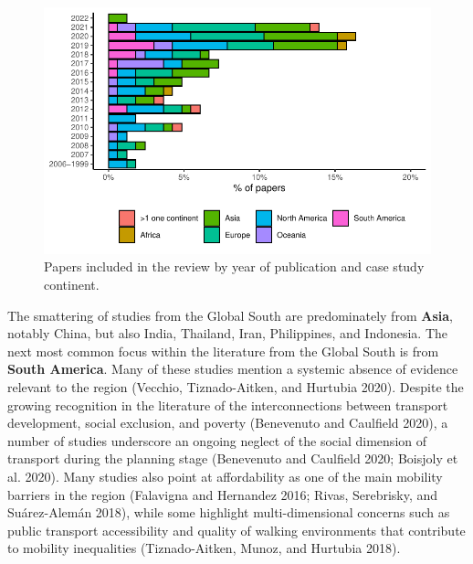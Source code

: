 \documentclass[12pt, oneside]{report}
\begin{document}
\begin{figure}

{\centering \includegraphics{just-transportation_files/figure-pdf/fig-fig3-1.pdf}

}

\caption{\label{fig-fig3}Papers included in the review by year of
publication and case study continent.}

\end{figure}

The smattering of studies from the Global South are predominately from
\textbf{Asia}, notably China, but also India, Thailand, Iran,
Philippines, and Indonesia. The next most common focus within the
literature from the Global South is from \textbf{South America}. Many of
these studies mention a systemic absence of evidence relevant to the
region (Vecchio, Tiznado-Aitken, and Hurtubia 2020). Despite the growing
recognition in the literature of the interconnections between transport
development, social exclusion, and poverty (Benevenuto and Caulfield
2020), a number of studies underscore an ongoing neglect of the social
dimension of transport during the planning stage (Benevenuto and
Caulfield 2020; Boisjoly et al. 2020). Many studies also point at
affordability as one of the main mobility barriers in the region
(Falavigna and Hernandez 2016; Rivas, Serebrisky, and Suárez-Alemán
2018), while some highlight multi-dimensional concerns such as public
transport accessibility and quality of walking environments that
contribute to mobility inequalities (Tiznado-Aitken, Munoz, and Hurtubia
2018).
\end{document}

